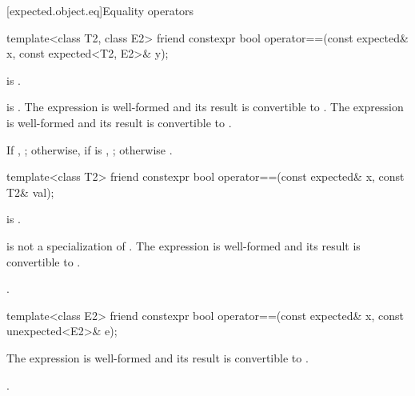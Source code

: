 [expected.object.eq]{Equality operators}

%
\begin{itemdecl}
template<class T2, class E2>
friend constexpr bool operator==(const expected& x, const expected<T2, E2>& y);
\end{itemdecl}

\begin{itemdescr}
\pnum
\constraints
{} is .

\pnum
\mandates
{} is . The expression  is well-formed and its result is convertible to . The expression  is well-formed and its result is convertible to .

\pnum
\returns
If , ; otherwise, if  is , ; otherwise .
\end{itemdescr}

%
\begin{itemdecl}
template<class T2> friend constexpr bool operator==(const expected& x, const T2& val);
\end{itemdecl}

\begin{itemdescr}
\pnum
\constraints
{} is .

\pnum
\mandates
{} is not a specialization of . The expression  is well-formed and its result is convertible to .

\pnum
\returns
{}.
\end{itemdescr}

%
\begin{itemdecl}
template<class E2>
friend constexpr bool operator==(const expected& x, const unexpected<E2>& e);
\end{itemdecl}

\begin{itemdescr}
\pnum
\mandates
The expression  is well-formed and its result is convertible to .

\pnum
\returns
{}.
\end{itemdescr}
